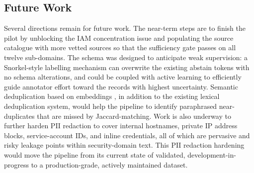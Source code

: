 \documentclass[conference]{IEEEtran}
\begin{document}
\subsection{Future Work}

Several directions remain for future work. The near-term steps are to finish the pilot by unblocking the IAM concentration issue and populating the source catalogue with more vetted sources so that the sufficiency gate passes on all twelve sub-domains. The schema was designed to anticipate weak supervision: a Snorkel-style labelling mechanism can overwrite the existing abstain tokens with no schema alterations, and could be coupled with active learning to efficiently guide annotator effort toward the records with highest uncertainty.
Semantic deduplication based on embeddings \cite{abbas2023semdedup}, in addition to the existing lexical deduplication system, would help the pipeline to identify paraphrased near-duplicates that are missed by Jaccard-matching. Work is also underway to further harden PII redaction to cover internal hostnames, private IP address blocks, service-account IDs, and inline credentials, all of which are pervasive and risky leakage points within security-domain text. This PII redaction hardening would move the pipeline from its current state of validated, development-in-progress to a production-grade, actively maintained dataset.
\end{document}
